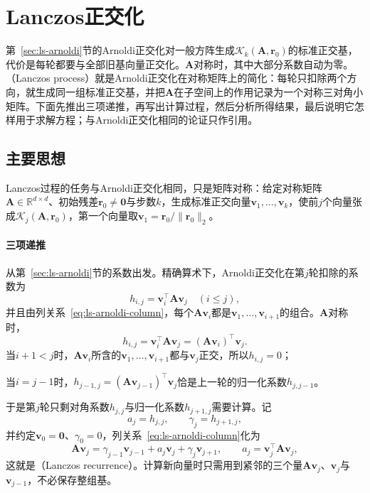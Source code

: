 \section{Lanczos正交化}
\label{sec:ls-lanczos}

第~\ref{sec:ls-arnoldi}节的Arnoldi正交化对一般方阵生成$\mathcal K_k(\bm A,\bm r_0)$的标准正交基，代价是每轮都要与全部旧基向量正交化。$\bm A$对称时，其中大部分系数自动为零。（Lanczos process）就是Arnoldi正交化在对称矩阵上的简化：每轮只扣除两个方向，就生成同一组标准正交基，并把$\bm A$在子空间上的作用记录为一个对称三对角小矩阵。下面先推出三项递推，再写出计算过程，然后分析所得结果，最后说明它怎样用于求解方程；与Arnoldi正交化相同的论证只作引用。

\subsection{主要思想}

Lanczos过程的任务与Arnoldi正交化相同，只是矩阵对称：给定对称矩阵$\bm A\in\mathbb R^{d\times d}$、初始残差$\bm r_0\ne\bm 0$与步数$k$，生成标准正交向量$\bm v_1,\ldots,\bm v_k$，使前$j$个向量张成$\mathcal K_j(\bm A,\bm r_0)$，第一个向量取$\bm v_1=\bm r_0/\lVert\bm r_0\rVert_2$。

\paragraph{三项递推}
从第~\ref{sec:ls-arnoldi}节的系数出发。精确算术下，Arnoldi正交化在第$j$轮扣除的系数为
\[
 h_{i,j}=\bm v_i^\top\bm A\bm v_j\quad(i\le j),
\]
并且由列关系~\eqref{eq:ls-arnoldi-column}，每个$\bm A\bm v_i$都是$\bm v_1,\ldots,\bm v_{i+1}$的组合。$\bm A$对称时，
\[
 h_{i,j}=\bm v_i^\top\bm A\bm v_j=(\bm A\bm v_i)^\top\bm v_j .
\]
当$i+1<j$时，$\bm A\bm v_i$所含的$\bm v_1,\ldots,\bm v_{i+1}$都与$\bm v_j$正交，所以$h_{i,j}=0$；

当$i=j-1$时，$h_{j-1,j}=(\bm A\bm v_{j-1})^\top\bm v_j$恰是上一轮的归一化系数$h_{j,j-1}$。

于是第$j$轮只剩对角系数$h_{j,j}$与归一化系数$h_{j+1,j}$需要计算。记
\begin{equation}
 a_j=h_{j,j},\qquad \gamma_j=h_{j+1,j},
 \label{eq:ls-lanczos-coefficients}
\end{equation}
并约定$\bm v_0=\bm 0$、$\gamma_0=0$，列关系~\eqref{eq:ls-arnoldi-column}化为
\begin{equation}
 \bm A\bm v_j=\gamma_{j-1}\bm v_{j-1}+a_j\bm v_j+\gamma_j\bm v_{j+1},\qquad a_j=\bm v_j^\top\bm A\bm v_j ,
 \label{eq:ls-arnoldi-lanczos}
\end{equation}
这就是（Lanczos recurrence）。计算新向量时只需用到紧邻的三个量$\bm A\bm v_j$、$\bm v_j$与$\bm v_{j-1}$，不必保存整组基。

